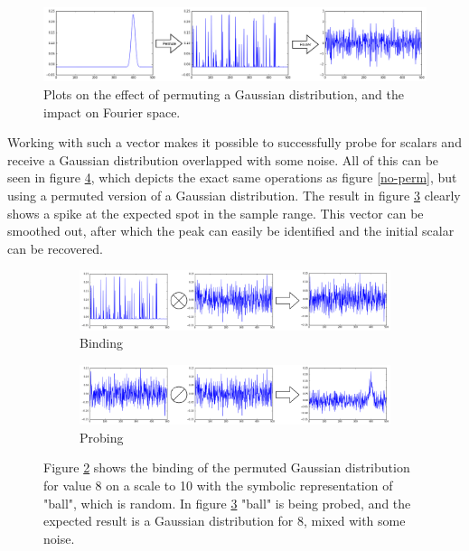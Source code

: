 \documentclass[conference]{IEEEtran}
\begin{document}
	\begin{figure}
		\includegraphics[width=\columnwidth]{img/scalar-perm-step-fft.png}
		\caption{Plots on the effect of permuting a Gaussian distribution, and the impact on Fourier space.}
		\label{perm-fft}
	\end{figure}
	
	Working with such a vector makes it possible to successfully probe for scalars and receive a Gaussian distribution overlapped with some noise.
All of this can be seen in figure \ref{perm}, which depicts the exact same operations as figure \ref{no-perm}, but using a permuted version of a Gaussian distribution.
The result in figure \ref{perm-b} clearly shows a spike at the expected spot in the sample range.
This vector can be smoothed out, after which the peak can easily be identified and the initial scalar can be recovered.
	
	\begin{figure}
		\begin{subfigure}{1\columnwidth}
			\includegraphics[width=\columnwidth]{img/scalar-post-perm.png}
			\caption{Binding}
			\label{perm-a}
		\end{subfigure}
		\begin{subfigure}{1\columnwidth}
			\includegraphics[width=\columnwidth]{img/scalar-post-perm-probe.png}
			\caption{Probing}
			\label{perm-b}
		\end{subfigure}
		\caption{Figure \ref{perm-a} shows the binding of the permuted Gaussian distribution for value 8 on a scale to 10 with the symbolic representation of "ball", which is random.
In figure \ref{perm-b} "ball" is being probed, and the expected result is a Gaussian distribution for 8, mixed with some noise.}
		\label{perm}
	\end{figure}
	
\end{document}
